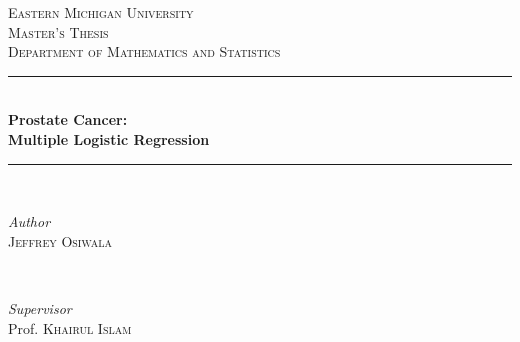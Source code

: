 \documentclass[12pt, a4paper]{article}
\begin{document}

\begin{titlepage} %
	\newcommand{\HRule}{\rule{\linewidth}{0.5mm}} %
	\center %
	
	\textsc{\LARGE Eastern Michigan University}\\[1.5cm] %
	\textsc{\Large Master's Thesis}\\[0.5cm] %
	\textsc{\large Department of Mathematics and Statistics}\\[0.5cm] %

	
	\HRule\\[0.4cm]
	{\huge\bfseries Prostate Cancer: \\ [0.5cm] Multiple Logistic Regression}\\[0.4cm] %
	\HRule\\[1.5cm]
	
	
	\begin{minipage}{0.4\textwidth}
		\begin{flushleft}
			\large
			\textit{Author}\\
			\textsc{Jeffrey Osiwala} %
		\end{flushleft}
	\end{minipage}
	~
	\begin{minipage}{0.4\textwidth}
		\begin{flushright}
			\large
			\textit{Supervisor}\\
			Prof. \textsc{Khairul Islam} %
		\end{flushright}
	\end{minipage}
	
	

\end{titlepage}
\end{document}
